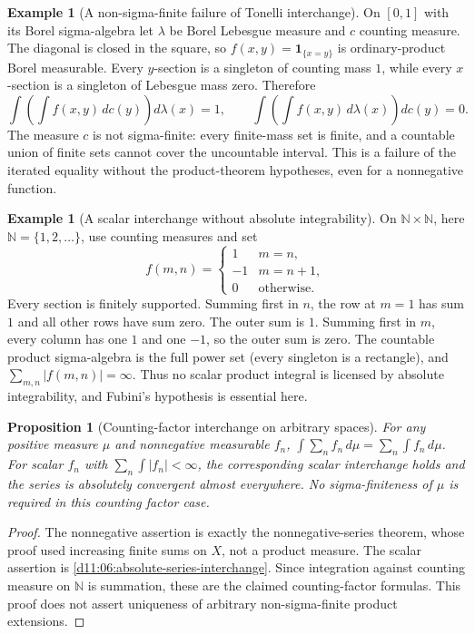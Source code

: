 \documentclass[11pt,oneside,openany]{book}
\newtheorem{proposition}[theorem]{Proposition}
\theoremstyle{definition}
\newtheorem{example}[theorem]{Example}
\theoremstyle{remark}
\newcommand{\N}{\mathbb N}\newcommand{\Z}{\mathbb Z}\newcommand{\Q}{\mathbb Q}
\newcommand{\one}{\mathbf1}\newcommand{\ind}[1]{\mathbf1_{#1}}
\newcommand{\family}[1]{}
\begin{document}
\begin{example}[A non-sigma-finite failure of Tonelli interchange]
\family{D11.08.nonsigma_finite_tonelli_failure}\label{d11:08:nonsigma-finite-tonelli-failure}
On $[0,1]$ with its Borel sigma-algebra let $\lambda$ be Borel Lebesgue
measure and $c$ counting measure. The diagonal is closed in the square,
so $f(x,y)=\one_{\{x=y\}}$ is ordinary-product Borel measurable. Every
$y$-section is a singleton of counting mass $1$, while every $x$-section
is a singleton of Lebesgue mass zero. Therefore
\[
 \int\left(\int f(x,y)\,dc(y)\right)d\lambda(x)=1,
 \qquad
 \int\left(\int f(x,y)\,d\lambda(x)\right)dc(y)=0.
\]
The measure $c$ is not sigma-finite: every finite-mass set is finite,
and a countable union of finite sets cannot cover the uncountable
interval. This is a failure of the iterated equality without the
product-theorem hypotheses, even for a nonnegative function.
\end{example}

\begin{example}[A scalar interchange without absolute integrability]
\family{D11.08.signed_fubini_failure}\label{d11:08:signed-fubini-failure}
On $\N\times\N$, here $\N=\{1,2,\ldots\}$, use counting measures and set
\[
 f(m,n)=\begin{cases}1&m=n,\\-1&m=n+1,\\0&\text{otherwise.}\end{cases}
\]
Every section is finitely supported. Summing first in $n$, the row at
$m=1$ has sum $1$ and all other rows have sum zero. The outer sum is
$1$. Summing first in $m$, every column has one $1$ and one $-1$, so the
outer sum is zero. The countable product sigma-algebra is the full power
set (every singleton is a rectangle), and $\sum_{m,n}|f(m,n)|=\infty$.
Thus no scalar product integral is licensed by absolute integrability,
and Fubini's hypothesis is essential here.
\end{example}

\begin{proposition}[Counting-factor interchange on arbitrary spaces]
\family{D11.08.sum_integral_counting}\label{d11:08:sum-integral-counting}
For any positive measure $\mu$ and nonnegative measurable $f_n$,
$\int\sum_nf_n\,d\mu=\sum_n\int f_n\,d\mu$.
For scalar $f_n$ with $\sum_n\int|f_n|<\infty$, the corresponding scalar
interchange holds and the series is absolutely convergent almost
everywhere. No sigma-finiteness of $\mu$ is required in this counting
factor case.
\end{proposition}
\begin{proof}
The nonnegative assertion is exactly the nonnegative-series theorem,
whose proof used increasing finite sums on $X$, not a product measure.
The scalar assertion is \cref{d11:06:absolute-series-interchange}.
Since integration against counting measure on $\N$ is summation, these
are the claimed counting-factor formulas. This proof does not assert
uniqueness of arbitrary non-sigma-finite product extensions.
\end{proof}
\end{document}
